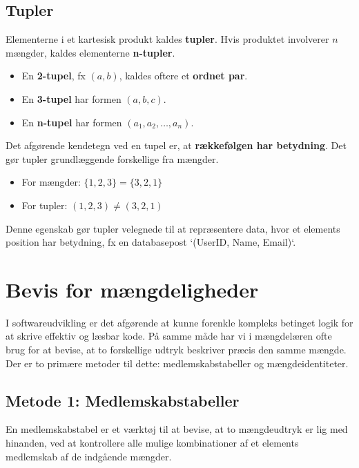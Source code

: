 \subsection*{Tupler}
Elementerne i et kartesisk produkt kaldes \textbf{tupler}. Hvis produktet involverer $n$ mængder, kaldes elementerne \textbf{n-tupler}.

\begin{itemize}
    \item En \textbf{2-tupel}, fx $(a, b)$, kaldes oftere et \textbf{ordnet par}.
    \item En \textbf{3-tupel} har formen $(a, b, c)$.
    \item En \textbf{n-tupel} har formen $(a_1, a_2, \dots, a_n)$.
\end{itemize}

Det afgørende kendetegn ved en tupel er, at \textbf{rækkefølgen har betydning}. Det gør tupler grundlæggende forskellige fra mængder.
\begin{itemize}
    \item For mængder: $\{1, 2, 3\} = \{3, 2, 1\}$
    \item For tupler: $(1, 2, 3) \neq (3, 2, 1)$
\end{itemize}
Denne egenskab gør tupler velegnede til at repræsentere data, hvor et elements position har betydning, fx en databasepost `(UserID, Name, Email)`.

\section{Bevis for mængdeligheder}
I softwareudvikling er det afgørende at kunne forenkle kompleks betinget logik for at skrive effektiv og læsbar kode. På samme måde har vi i mængdelæren ofte brug for at bevise, at to forskellige udtryk beskriver præcis den samme mængde. Der er to primære metoder til dette: medlemskabstabeller og mængdeidentiteter.

\subsection*{Metode 1: Medlemskabstabeller}
En medlemskabstabel er et værktøj til at bevise, at to mængdeudtryk er lig med hinanden, ved at kontrollere alle mulige kombinationer af et elements medlemskab af de indgående mængder.

